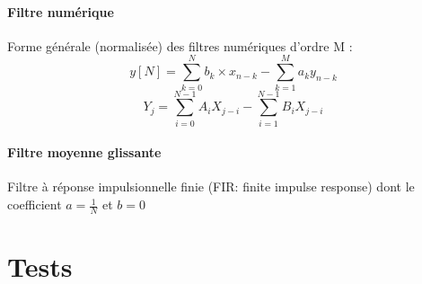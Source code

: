 \documentclass{article}
\begin{document}









    \paragraph{Filtre numérique}
    Forme générale (normalisée) des filtres numériques d'ordre M :
    $$ y[N] = \sum\limits_{k=0}^{N} b_k \times x_{n-k} - \sum\limits_{k=1}^{M} a_k y_{n-k} $$
    $$ Y_j = \sum\limits_{i=0}^{N-1} A_i X_{j-i} - \sum\limits_{i=1}^{N-1} B_i X_{j-i} $$

    \paragraph{Filtre moyenne glissante}
    Filtre à réponse impulsionnelle finie (FIR: finite impulse response) dont le coefficient $a = \frac{1}{N}$ et $b = 0$


    \section{Tests}
\end{document}
